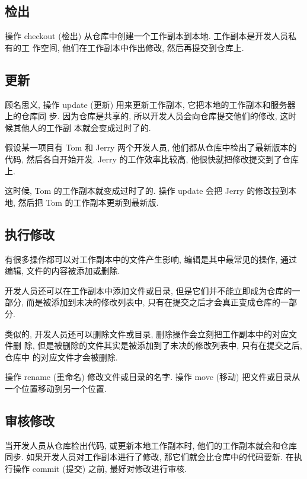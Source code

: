 \documentclass[nofonts, oneside]{ctexart}
\begin{document}
\subsection{检出}
\label{subsec:checkout}

操作 checkout (检出) 从仓库中创建一个工作副本到本地. 工作副本是开发人员私有的工
作空间, 他们在工作副本中作出修改, 然后再提交到仓库上.

\subsection{更新}
\label{subsec:update}

顾名思义, 操作 update (更新) 用来更新工作副本, 它把本地的工作副本和服务器上的仓库同
步. 因为仓库是共享的, 所以开发人员会向仓库提交他们的修改, 这时候其他人的工作副
本就会变成过时了的.

假设某一项目有 Tom 和 Jerry 两个开发人员, 他们都从仓库中检出了最新版本的代码,
然后各自开始开发. Jerry 的工作效率比较高, 他很快就把修改提交到了仓库上.

这时候, Tom 的工作副本就变成过时了的. 操作 update 会把 Jerry 的修改拉到本地,
然后把 Tom 的工作副本更新到最新版.

\subsection{执行修改}
\label{subsec:perform_changes}

有很多操作都可以对工作副本中的文件产生影响, 编辑是其中最常见的操作, 通过编辑,
文件的内容被添加或删除.

开发人员还可以在工作副本中添加文件或目录, 但是它们并不能立即成为仓库的一部分,
而是被添加到未决的修改列表中, 只有在提交之后才会真正变成仓库的一部分.

类似的, 开发人员还可以删除文件或目录, 删除操作会立刻把工作副本中的对应文件删
除, 但是被删除的文件其实是被添加到了未决的修改列表中, 只有在提交之后, 仓库中
的对应文件才会被删除.

操作 rename (重命名) 修改文件或目录的名字. 操作 move (移动) 把文件或目录从
一个位置移动到另一个位置.

\subsection{审核修改}
\label{subsec:review_changes}

当开发人员从仓库检出代码, 或更新本地工作副本时, 他们的工作副本就会和仓库同步.
如果开发人员对工作副本进行了修改, 那它们就会比仓库中的代码要新. 在执行操作
commit (提交) 之前, 最好对修改进行审核.
\end{document}
